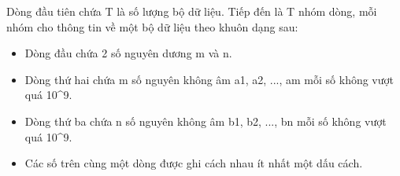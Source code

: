 Dòng đầu tiên chứa T là số lượng bộ dữ liệu. Tiếp đến là T nhóm dòng, mỗi nhóm cho thông tin về một bộ dữ liệu theo khuôn dạng sau:
\begin{itemize}
	\item Dòng đầu chứa 2 số nguyên dương m và n.
	\item Dòng thứ hai chứa m số nguyên không âm a1, a2, ..., am mỗi số không vượt quá 10^9.
	\item Dòng thứ ba chứa n số nguyên không âm b1, b2, ..., bn mỗi số không vượt quá 10^9.
	\item Các số trên cùng một dòng được ghi cách nhau ít nhất một dấu cách.
\end{itemize}